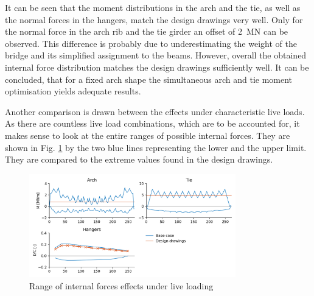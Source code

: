 It can be seen that the moment distributions in the arch and the tie, as well as the normal forces in the hangers, match the design drawings very well. Only for the normal force in the arch rib and the tie girder an offset of \SI{2}{MN} can be observed. This difference is probably due to underestimating the weight of the bridge and its simplified assignment to the beams. However, overall the obtained internal force distribution matches the design drawings sufficiently well. It can be concluded, that for a fixed arch shape the simultaneous arch and tie moment optimisation yields adequate results.\medskip

Another comparison is drawn between the effects under characteristic live loads. As there are countless live load combinations, which are to be accounted for, it makes sense to look at the entire ranges of possible internal forces. They are shown in Fig. \ref{fig:base_case_live} by the two blue lines representing the lower and the upper limit. They are compared to the extreme values found in the design drawings.

\begin{figure}[H]
    \centering
    \includegraphics[width=0.8\textwidth]{calculations/Base case/Live load.png}
    \caption{Range of internal forces effects under live loading}
    \label{fig:base_case_live}
\end{figure}

